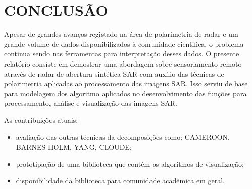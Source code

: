 \documentclass[a4paper,12pt]{article}
\begin{document}
\newpage
\section{CONCLUSÃO}

Apesar de grandes avanços registado na área de polarimetria de radar e um grande volume de dados disponibilizados à comunidade cientifica, o problema continua sendo nas ferramentas para interpretação desses dados. O presente relatório consiste em demostrar uma abordagem sobre sensoriamento remoto através de radar de abertura sintética SAR com auxílio das técnicas de polarimetria aplicadas ao processamento das imagens SAR. Isso serviu de base para modelagem dos algoritmo aplicados no desenvolvimento das funções para processamento, análise e visualização das imagens SAR.

As contribuições atuais: 

\begin{itemize}
    \item avaliação das outras técnicas da decomposições como:  CAMEROON, BARNES-HOLM, YANG, CLOUDE;
    \item prototipação de uma biblioteca que contém os algoritmos de visualização;
    \item disponibilidade da biblioteca para comunidade acadêmica em geral.  
\end{itemize}

\newpage


\end{document}
